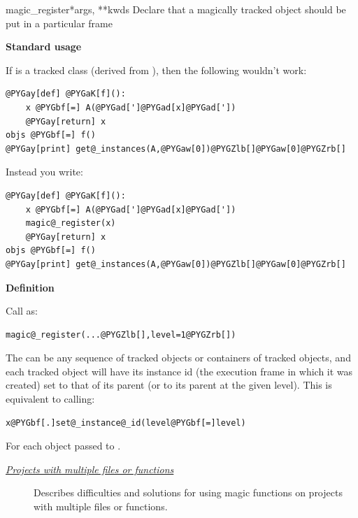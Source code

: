 \documentclass[letterpaper,10pt,english]{manual}
\begin{document}
\hypertarget{brian.magic_register}{}\begin{funcdesc}{magic\_register}{*args, **kwds}
Declare that a magically tracked object should be put in a particular frame

\textbf{Standard usage}

If  is a tracked class (derived from ), then the following wouldn't
work:

\begin{Verbatim}[commandchars=@\[\]]
@PYGay[def] @PYGaK[f]():
    x @PYGbf[=] A(@PYGad[']@PYGad[x]@PYGad['])
    @PYGay[return] x
objs @PYGbf[=] f()
@PYGay[print] get@_instances(A,@PYGaw[0])@PYGZlb[]@PYGaw[0]@PYGZrb[]
\end{Verbatim}

Instead you write:

\begin{Verbatim}[commandchars=@\[\]]
@PYGay[def] @PYGaK[f]():
    x @PYGbf[=] A(@PYGad[']@PYGad[x]@PYGad['])
    magic@_register(x)
    @PYGay[return] x    
objs @PYGbf[=] f()
@PYGay[print] get@_instances(A,@PYGaw[0])@PYGZlb[]@PYGaw[0]@PYGZrb[]
\end{Verbatim}

\textbf{Definition}

Call as:

\begin{Verbatim}[commandchars=@\[\]]
magic@_register(...@PYGZlb[],level=1@PYGZrb[])
\end{Verbatim}

The  can be any sequence of tracked objects or containers of tracked objects,
and each tracked object will have its instance id (the execution frame in which it was
created) set to that of its parent (or to its parent at the given level). This is
equivalent to calling:

\begin{Verbatim}[commandchars=@\[\]]
x@PYGbf[.]set@_instance@_id(level@PYGbf[=]level)
\end{Verbatim}

For each object  passed to \hyperlink{brian.magic_register}{}.
\end{funcdesc}



\begin{description}
\item[\hyperlink{projects-with-multiple-files}{\emph{Projects with multiple files or functions}}]
Describes difficulties and solutions for using magic functions
on projects with multiple files or functions.

\end{description}
\end{document}
